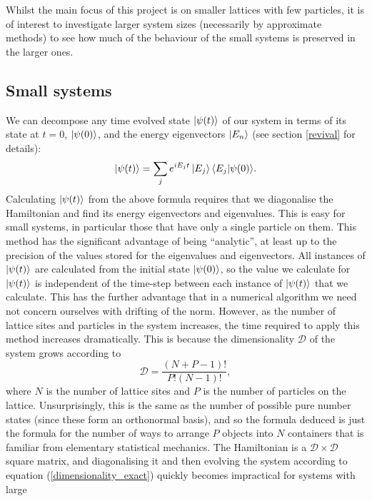 \documentclass[a4paper, 10pt]{article}
\theoremstyle{plain}
\begin{document}
Whilst the main focus of this project is on smaller lattices with few particles,
it is of interest to investigate larger system sizes (necessarily by approximate
methods) to see how much of the behaviour of the small systems is preserved in
the larger ones.

\subsection{Small systems}

We can decompose any time evolved state $\ket{\psi(t)}$ of our system in terms
of its state at $t=0$, $\ket{\psi(0)}$, and the energy eigenvectors $\ket{E_n}$
(see section \ref{revival} for details):
\begin{equation}
    \ket{\psi(t)} = \sum_{j}{e^{i E_{j}t} \ket{E_{j}} \braket{E_{j}|\psi(0)}}.
\end{equation}
Calculating $\ket{\psi(t)}$ from the above formula requires that we diagonalise
the Hamiltonian and find its energy eigenvectors and eigenvalues. This is easy
for small systems, in particular those that have only a single particle on them.
This method has the significant advantage of being ``analytic'', at least up to
the precision of the values stored for the eigenvalues and eigenvectors. All
instances of $\ket{\psi(t)}$ are calculated from the initial state
$\ket{\psi(0)}$, so the value we calculate for $\ket{\psi(t)}$ is independent of
the time-step between each instance of $\ket{\psi(t)}$ that we calculate. This
has the further advantage that in a numerical algorithm we need not concern
ourselves with drifting of the norm. However, as the number of lattice sites and
particles in the system increases, the time required to apply this method
increases dramatically. This is because the dimensionality $\mathcal{D}$ of the
system grows according to
\begin{equation}
    \label{dimensionality_exact}
    \mathcal{D} = \frac{(N + P - 1)!}{P! (N-1)!},
\end{equation}
where $N$ is the number of lattice sites and $P$ is the number of particles on
the lattice. Unsurprisingly, this is the same as the number of possible pure
number states (since these form an orthonormal basis), and so the formula
deduced is just the formula for the number of ways to arrange $P$ objects into
$N$ containers that is familiar from elementary statistical mechanics.
The Hamiltonian is a $\mathcal{D} \times \mathcal{D}$ square matrix, and
diagonalising it and then evolving the system according to equation
(\ref{dimensionality_exact}) quickly becomes impractical for systems with large
\end{document}
